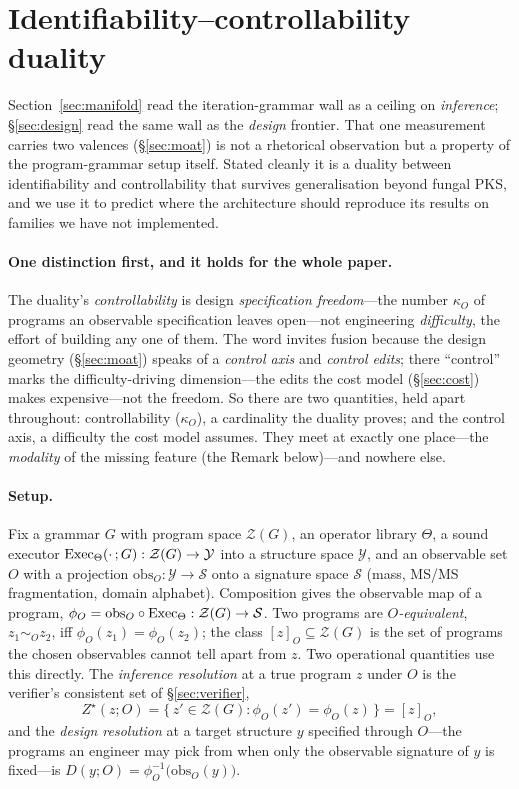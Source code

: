 \section{Identifiability--controllability duality}\label{sec:duality}

Section~\ref{sec:manifold} read the iteration-grammar wall as a ceiling on \emph{inference}; \S\ref{sec:design}
read the same wall as the \emph{design} frontier. That one measurement carries two valences
(\S\ref{sec:moat}) is not a rhetorical observation but a property of the program-grammar setup itself.
Stated cleanly it is a duality between identifiability and controllability that survives generalisation
beyond fungal PKS, and we use it to predict where the architecture should reproduce its results on
families we have not implemented.

\paragraph{One distinction first, and it holds for the whole paper.} The duality's \emph{controllability} is
design \emph{specification freedom}---the number $\kappa_O$ of programs an observable specification leaves
open---not engineering \emph{difficulty}, the effort of building any one of them. The word invites fusion
because the design geometry (\S\ref{sec:moat}) speaks of a \emph{control axis} and \emph{control edits};
there ``control'' marks the difficulty-driving dimension---the edits the cost model (\S\ref{sec:cost})
makes expensive---not the freedom. So there are two quantities, held apart throughout: controllability
($\kappa_O$), a cardinality the duality proves; and the control axis, a difficulty the cost model assumes.
They meet at exactly one place---the \emph{modality} of the missing feature (the Remark below)---and nowhere
else.

\paragraph{Setup.} Fix a grammar $G$ with program space $\mathcal{Z}(G)$, an operator library $\Theta$, a
sound executor $\mathrm{Exec}_\Theta(\cdot\,;G):\mathcal{Z}(G)\to\mathcal{Y}$ into a structure space $\mathcal{Y}$,
and an observable set $O$ with a projection $\mathrm{obs}_O:\mathcal{Y}\to\mathcal{S}$ onto a signature
space $\mathcal{S}$ (mass, MS/MS fragmentation, domain alphabet). Composition gives the observable map of a
program, $\phi_O=\mathrm{obs}_O\circ\mathrm{Exec}_\Theta:\mathcal{Z}(G)\to\mathcal{S}$. Two programs are
\emph{$O$-equivalent}, $z_1\sim_O z_2$, iff $\phi_O(z_1)=\phi_O(z_2)$; the class
$[z]_O\subseteq\mathcal{Z}(G)$ is the set of programs the chosen observables cannot tell apart from $z$.
Two operational quantities use this directly. The \emph{inference resolution} at a true program $z$ under
$O$ is the verifier's consistent set of \S\ref{sec:verifier},
\[
Z^{\star}(z;O)=\{\,z'\in\mathcal{Z}(G):\phi_O(z')=\phi_O(z)\,\}=[z]_O,
\]
and the \emph{design resolution} at a target structure $y$ specified through $O$---the programs an
engineer may pick from when only the observable signature of $y$ is fixed---is
$D(y;O)=\phi_O^{-1}\!\bigl(\mathrm{obs}_O(y)\bigr)$.

